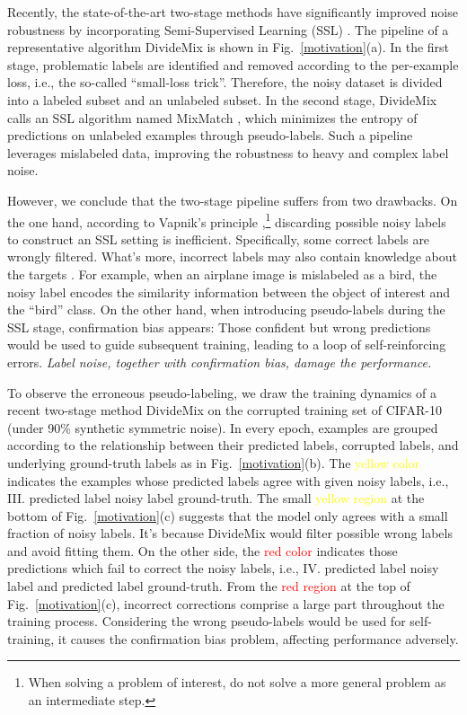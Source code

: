\documentclass[letterpaper]{article} \usepackage{aaai23}  \usepackage{times}  \usepackage{helvet}  \usepackage{courier}  \usepackage[hyphens]{url}  \usepackage{graphicx} \urlstyle{rm} \def\UrlFont{\rm}  \usepackage{natbib}  \usepackage{caption} \frenchspacing  \setlength{\pdfpagewidth}{8.5in} \setlength{\pdfpageheight}{11in} \usepackage{algorithm}
\begin{document}
Recently, the state-of-the-art two-stage methods have significantly improved noise robustness by incorporating Semi-Supervised Learning (SSL) \cite{ding2018semi,nguyen2019self,li2020dividemix,zhou2021robust}.
The pipeline of a representative algorithm DivideMix \cite{li2020dividemix} is shown in Fig.~\ref{motivation}(a). 
In the first stage, problematic labels are identified and removed according to the per-example loss, i.e., the so-called  ``small-loss trick''.
Therefore, the noisy dataset is divided into a labeled subset and an unlabeled subset. 
In the second stage, DivideMix calls an SSL algorithm named MixMatch \cite{berthelot2019mixmatch}, which minimizes the entropy of predictions on unlabeled examples through pseudo-labels.
Such a pipeline leverages mislabeled data, improving the robustness to heavy and complex label noise.

However, we conclude that the two-stage pipeline suffers from two drawbacks.
On the one hand, according to Vapnik's principle \cite{Vapnik1998,Chapelle2006},\footnote{When solving a problem of interest, do not solve a more general problem as an intermediate step.} discarding possible noisy labels to construct an SSL setting is inefficient. 
Specifically, some correct labels are wrongly filtered. What's more, incorrect labels may also contain knowledge about the targets \cite{yu2018learning,ishida2017learning,kim2019nlnl,berthon2021confidence}.
For example, when an airplane image is mislabeled as a bird, the noisy label encodes the similarity information between the object of interest and the ``bird'' class.
On the other hand, when introducing pseudo-labels during the SSL stage, confirmation bias \cite{tarvainen2017mean,arazo2020pseudo} appears:
Those confident but wrong predictions would be used to guide subsequent training, leading to a loop of self-reinforcing errors.
\emph{Label noise, together with confirmation bias, damage the performance.}

To observe the erroneous pseudo-labeling, we draw the training dynamics of a recent two-stage method DivideMix \cite{li2020dividemix} on the corrupted training set of CIFAR-10 \cite{krizhevsky2009learning} (under 90\% synthetic symmetric noise).
In every epoch, examples are grouped according to the relationship between their predicted labels, corrupted labels, and underlying ground-truth labels as in Fig.~\ref{motivation}(b).
The \textcolor{yellow}{yellow color} indicates the examples whose predicted labels agree with given noisy labels, i.e., III. predicted label  noisy label  ground-truth.
The small \textcolor{yellow}{yellow region} at the bottom of Fig.~\ref{motivation}(c) suggests that the model only agrees with a small fraction of noisy labels.
It's because DivideMix would filter possible wrong labels and avoid fitting them.
On the other side, the \textcolor{red}{red color} indicates those predictions which fail to correct the noisy labels, i.e., IV. predicted label  noisy label and predicted label  ground-truth.
From the \textcolor{red}{red region} at the top of Fig.~\ref{motivation}(c), incorrect corrections comprise a large part throughout the training process.
Considering the wrong pseudo-labels would be used for self-training, it causes the confirmation bias problem, affecting performance adversely.
\end{document}
